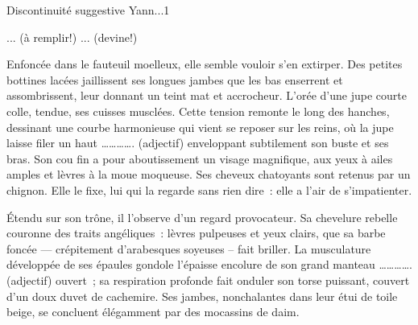 \documentclass{parch}
\begin{document}
	\begin{parchArticle}{Discontinuité suggestive}
		{Yann}{...}{1}
		\begin{parchResumeTheme}{... (à remplir!)}
			... (devine!)
		\end{parchResumeTheme}
		Enfoncée dans le fauteuil moelleux, elle semble vouloir s'en extirper. Des petites bottines lacées jaillissent ses longues jambes que les bas enserrent et assombrissent, leur donnant un teint mat et accrocheur. L'orée d'une jupe courte colle, tendue, ses cuisses musclées. Cette tension remonte le long des hanches, dessinant une courbe harmonieuse qui vient se reposer sur les reins, où la jupe laisse filer un haut …………. (adjectif) enveloppant subtilement son buste et ses bras. Son cou fin a pour aboutissement un visage magnifique, aux yeux à ailes amples et lèvres à la moue moqueuse. Ses cheveux chatoyants sont retenus par un chignon. Elle le fixe, lui qui la regarde sans rien dire : elle a l'air de s'impatienter.
		
		Étendu sur son trône, il l'observe d'un regard provocateur. Sa chevelure rebelle couronne des traits angéliques : lèvres pulpeuses et yeux clairs, que sa barbe foncée --- crépitement d'arabesques soyeuses – fait briller. La musculature développée de ses épaules gondole l'épaisse encolure de son grand manteau …………. (adjectif) ouvert ; sa respiration profonde fait onduler son torse puissant, couvert d'un doux duvet de cachemire. Ses jambes, nonchalantes dans leur étui de toile beige, se concluent élégamment par des mocassins de daim.
		

\end{parchArticle}
\end{document}
